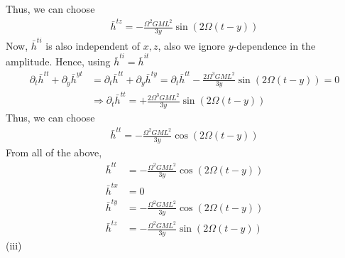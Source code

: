 \documentclass[12pt]{article}
\begin{document}
Thus, we can choose
\begin{align}
\bar{h}^{tz} = - \frac{\Omega^2 G M L^2}{3 y} \sin\left(2 \Omega (t-y)\right)
\end{align}
Now, $\bar{h}^{t i}$ is also independent of $x, z$, also we ignore $y$-dependence in the amplitude. Hence, using $\bar{h}^{t i} = \bar{h}^{i t}$
\begin{align}
\partial_{t} \bar{h}^{tt} + \partial_{y} \bar{h}^{yt} &= \partial_{t} \bar{h}^{tt} + \partial_{y} \bar{h}^{ty} = \partial_{t} \bar{h}^{tt} - \frac{2 \Omega^3 G M L^2}{3 y} \sin\left(2 \Omega (t-y)\right) = 0\\
& \Rightarrow \partial_{t} \bar{h}^{tt} = + \frac{2 \Omega^3 G M L^2}{3 y} \sin\left(2 \Omega (t-y)\right)
\end{align}
Thus, we can choose
\begin{align}
\bar{h}^{tt} = - \frac{\Omega^2 G M L^2}{3 y} \cos\left(2 \Omega (t-y)\right)
\end{align}
From all of the above,
\begin{align}
\bar{h}^{tt} &= - \frac{\Omega^2 G M L^2}{3 y} \cos\left(2 \Omega (t-y)\right) \\
\bar{h}^{tx} &= 0 \\
\bar{h}^{ty} &= - \frac{\Omega^2 G M L^2}{3 y} \cos\left(2 \Omega (t-y)\right) \\
\bar{h}^{tz} &= - \frac{\Omega^2 G M L^2}{3 y} \sin\left(2 \Omega (t-y)\right)
\end{align}
(iii)
\end{document}
